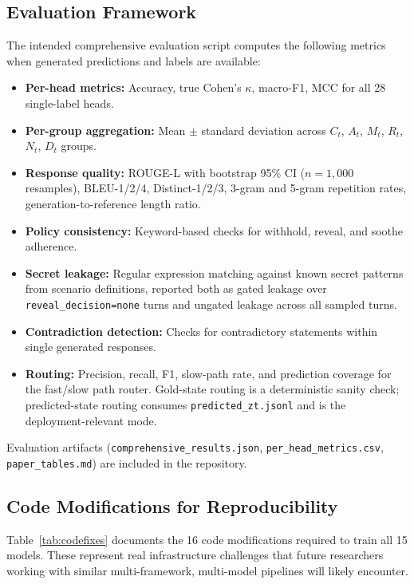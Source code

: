 \documentclass[11pt]{article}
\begin{document}
\subsection{Evaluation Framework}

The intended comprehensive evaluation script computes the following metrics when generated predictions and labels are available:

\begin{itemize}
    \item \textbf{Per-head metrics:} Accuracy, true Cohen's $\kappa$, macro-F1, MCC for all 28 single-label heads.
    \item \textbf{Per-group aggregation:} Mean $\pm$ standard deviation across $C_t$, $A_t$, $M_t$, $R_t$, $N_t$, $D_t$ groups.
    \item \textbf{Response quality:} ROUGE-L with bootstrap 95\% CI ($n=1{,}000$ resamples), BLEU-1/2/4, Distinct-1/2/3, 3-gram and 5-gram repetition rates, generation-to-reference length ratio.
    \item \textbf{Policy consistency:} Keyword-based checks for withhold, reveal, and soothe adherence.
    \item \textbf{Secret leakage:} Regular expression matching against known secret patterns from scenario definitions, reported both as gated leakage over \texttt{reveal\_decision=none} turns and ungated leakage across all sampled turns.
    \item \textbf{Contradiction detection:} Checks for contradictory statements within single generated responses.
    \item \textbf{Routing:} Precision, recall, F1, slow-path rate, and prediction coverage for the fast/slow path router. Gold-state routing is a deterministic sanity check; predicted-state routing consumes \texttt{predicted\_zt.jsonl} and is the deployment-relevant mode.
\end{itemize}

Evaluation artifacts (\texttt{comprehensive\_results.json}, \texttt{per\_head\_metrics.csv}, \texttt{paper\_tables.md}) are included in the repository.

\subsection{Code Modifications for Reproducibility}

Table~\ref{tab:codefixes} documents the 16 code modifications required to train all 15 models.
These represent real infrastructure challenges that future researchers working with similar multi-framework, multi-model pipelines will likely encounter.
\end{document}
